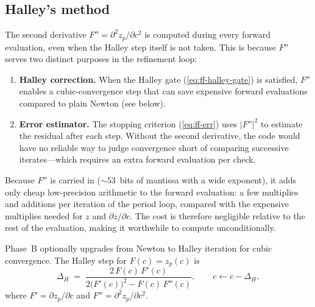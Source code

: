 \subsection{Halley's method}
\label{subsec:ff-halley}

The second derivative $F'' = \partial^2 z_p/\partial c^2$ is computed during
every forward evaluation, even when the Halley step itself is not taken.  This
is because $F''$ serves two distinct purposes in the refinement loop:

\begin{enumerate}
\item \textbf{Halley correction.}  When the Halley gate (\cref{eq:ff-halley-gate})
  is satisfied, $F''$ enables a cubic-convergence step that can save expensive
  forward evaluations compared to plain Newton (see below).
\item \textbf{Error estimator.}  The stopping criterion
  (\cref{eq:ff-err}) uses $|F''|^2$ to estimate the residual after
  each step.  Without the second derivative, the code would have no reliable
  way to judge convergence short of comparing successive iterates---which
  requires an extra forward evaluation per check.
\end{enumerate}

Because $F''$ is carried in  (${\sim}53$~bits of
mantissa with a wide exponent), it adds only cheap low-precision arithmetic to
the forward evaluation: a few  multiplies and additions per
iteration of the period loop, compared with the expensive 
multiplies needed for $z$ and $\partial z/\partial c$.  The cost is therefore
negligible relative to the rest of the evaluation, making it worthwhile to
compute unconditionally.

Phase~B optionally upgrades from Newton to Halley iteration for cubic
convergence.  The Halley step for $F(c) = z_p(c)$ is
\begin{equation}\label{eq:ff-halley-step}
\Delta_H \;=\;
  \frac{2\,F(c)\,F'(c)}
       {2\bigl(F'(c)\bigr)^2 - F(c)\,F''(c)},
\qquad c \leftarrow c - \Delta_H,
\end{equation}
where $F'=\partial z_p/\partial c$ and $F''=\partial^2 z_p/\partial c^2$.

